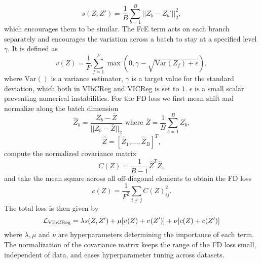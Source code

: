 \documentclass[../../thesis.tex]{subfiles}
\begin{document}
\begin{equation}
    s(Z,Z') = \frac{1}{B} \sum_{b=1}^B || Z_b-Z_b'||_2^2,
\end{equation}
which encourages them to be similar. The FcE term acts on each branch separately and encourages the variation across a batch to stay at a specified level $\gamma$. It is defined as 
\begin{equation}
    v(Z) =  \frac{1}{F} \sum_{f=1}^F \max(0,\gamma - \sqrt{\text{Var}(Z_f)+\epsilon}),
\end{equation}
where $\text{Var}()$ is a variance estimator, $\gamma$ is a target value for the standard deviation, which both in VIbCReg and VICReg is set to $1$. $\epsilon$ is a small scalar preventing numerical instabilities. 
\newline 
For the FD loss we first mean shift and normalize along the batch dimension
\begin{equation}
    \widehat{Z}_b = \frac{Z_b-\bar{Z}}{||Z_b-\bar{Z}||_2} \text{ where }  \bar{Z} = \frac{1}{B}\sum_{b=1}^B  Z_b,
\end{equation}
\begin{equation}
    \widehat{Z} = [\widehat{Z}_1,...,\widehat{Z}_B]^T,
\end{equation}
compute the normalized covariance matrix
\begin{equation}
    C(Z) = \frac{1}{B-1}\widehat{Z}^T \widehat{Z},
\end{equation}
and take the mean square across all off-diagonal elements to obtain the FD loss
\begin{equation}
    c(Z) = \frac{1}{F^2}\sum_{i\neq j} C(Z)_{ij}^2.
\end{equation}
The total loss is then given by
\begin{equation}
    \mathcal{L}_\text{VIbCReg} = \lambda s(Z,Z') + \mu [v(Z) + v(Z')] + \nu[c(Z)+c(Z')]
\end{equation}
where $\lambda, \mu$ and $\nu$ are hyperparameters determining the importance of each term. The normalization of the covariance matrix keeps the range of the FD loss small, independent of data, and eases hyperparameter tuning across datasets.
\end{document}
